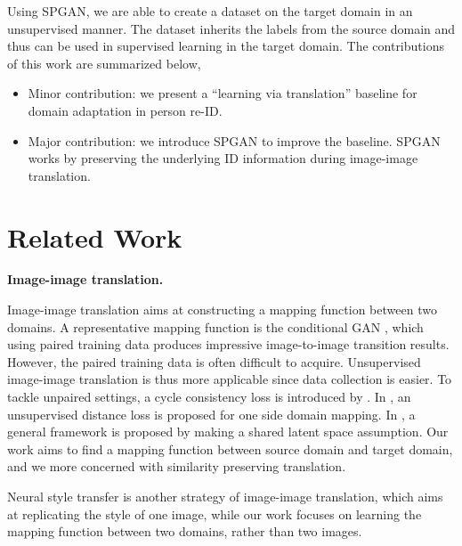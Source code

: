 \documentclass[10pt,twocolumn,letterpaper]{article}
\begin{document}
Using SPGAN, we are able to create a dataset on the target domain in an unsupervised manner. The dataset inherits the labels from the source domain and thus can be used in supervised learning in the target domain. The contributions of this work are summarized below,
\begin{itemize}
\item Minor contribution: we present a ``learning via translation'' baseline for domain adaptation in person re-ID.
\item Major contribution: we introduce SPGAN to improve the baseline. SPGAN works by preserving the underlying ID information during image-image translation.
\end{itemize}

\section{Related Work} \label{Related Works}
\textbf{Image-image translation.}

Image-image translation aims at constructing a mapping function between two domains. A representative mapping function is the conditional GAN \cite{DBLP:journals/corr/IsolaZZE16}, which using paired training data produces impressive image-to-image transition results. However, the paired training data is often difficult to acquire. Unsupervised image-image translation is thus more applicable since data collection is easier. To tackle unpaired settings,  a cycle consistency loss is introduced by \cite{DiscoGAN, DualGAN, cycle}. In \cite{DBLP:journals/corr/BenaimW17}, an unsupervised distance loss is proposed for one side domain mapping. In \cite{DBLP:journals/corr/LiuBK17}, a general framework is proposed by making a shared latent space assumption. Our work aims to find a mapping function between source domain and target domain, and we more concerned with similarity preserving translation.

Neural style transfer \cite{DBLP:conf/cvpr/GatysEB16, DBLP:conf/eccv/LiW16, DBLP:conf/icml/UlyanovLVL16, DBLP:conf/eccv/JohnsonAF16, DBLP:journals/corr/ChenS16f, DBLP:journals/corr/LiFYWL017, DBLP:journals/corr/HuangB17, DBLP:conf/ijcai/LiWLH17} is another strategy of image-image translation, which aims at replicating the style of one image, while our work focuses on learning the mapping function between two domains, rather than two images. 
\end{document}
